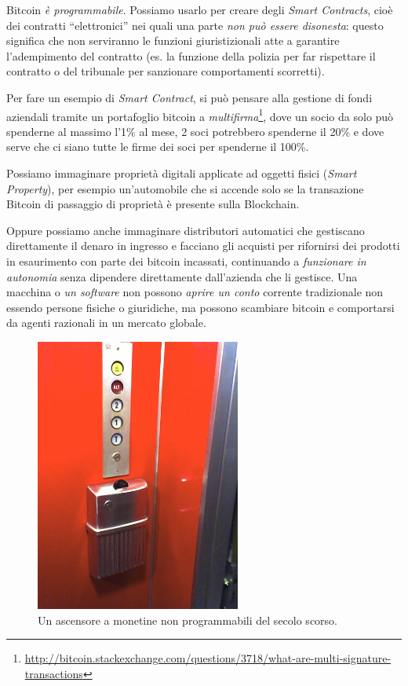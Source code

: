 \documentclass[a4paper,12pt,italian]{article}
\newcommand{\longurl}[1]{%
\href{#1}{\ttfamily \smaller #1}%
}%
\begin{document}
\bigskip

Bitcoin \emph{è programmabile}. Possiamo usarlo per creare degli \emph{Smart
Contracts}, cioè dei contratti ``elettronici'' nei quali una parte \emph{non può essere
disonesta}: questo significa che non serviranno le funzioni
giuristizionali atte a garantire l’adempimento del contratto (es. la
funzione della polizia per far rispettare il contratto o del tribunale
per sanzionare comportamenti scorretti).

\bigskip

Per fare un esempio di \emph{Smart Contract}, si può pensare alla gestione di fondi aziendali
tramite un portafoglio bitcoin a \emph{multifirma}\footnote{\longurl{http://bitcoin.stackexchange.com/questions/3718/what-are-multi-signature-transactions}}, 
dove un socio da solo può spenderne al
massimo l’1\% al mese, 2 soci potrebbero spenderne il 20\% e dove serve che ci siano
tutte le firme dei soci per spenderne il 100\%.


\bigskip

Possiamo immaginare proprietà digitali applicate ad oggetti
fisici (\emph{Smart Property}), per esempio un’automobile che si accende solo
se la transazione Bitcoin di passaggio di proprietà è presente sulla
Blockchain.


\bigskip

Oppure possiamo anche immaginare distributori automatici che gestiscano direttamente
il denaro in ingresso e facciano gli acquisti per rifornirsi dei
prodotti in esaurimento con parte dei bitcoin incassati, continuando a
\emph{funzionare in autonomia} senza dipendere direttamente dall’azienda che
li gestisce. Una macchina o \emph{un software} non possono \emph{aprire un conto}
corrente tradizionale non essendo persone fisiche o giuridiche, ma
possono scambiare bitcoin e comportarsi da agenti razionali in un
mercato globale.

\begin{figure}
\centering
\includegraphics[height=9cm]{figures/elevator.jpg}
\caption{Un ascensore a monetine non programmabili del secolo scorso.}
\end{figure}
\end{document}
